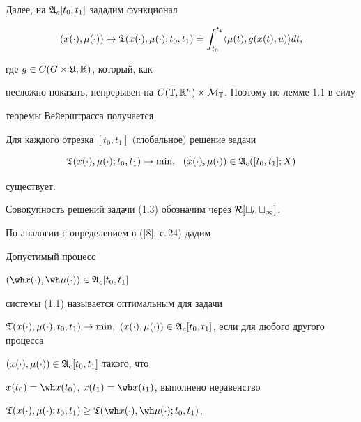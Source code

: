 Далее, на $\frak A_c[t_0,t_1]$ зададим функционал


\begin{equation}


(x(\cdot),\mu(\cdot))\mapsto


\frak T(x(\cdot),\mu(\cdot);t_0,t_1)


\doteq\int_{t_0}^{t_1}\langle\mu(t),g(x(t),u)\rangle dt,


\end{equation}


где $g\in C(G\times\frak U,\Bbb R)$, который, как


несложно показать, непрерывен на $C(\Bbb T,\Bbb R^n)


\times\cal M_{\Bbb T}$. Поэтому по лемме 1.1 в силу


теоремы Вейерштрасса получается








\begin{lems}


Для каждого отрезка $[t_0,t_1]$ $($глобальное\/$)$ решение задачи


\begin{equation}


\frak T(x(\cdot),\mu(\cdot);t_0,t_1)\to\min,\ \ (x(\cdot),\mu(\cdot))


\in\frak A_c([t_0,t_1];X)


\end{equation}


существует.


\end{lems}





Совокупность решений задачи (1.3) обозначим через $\cal R[t_0,t_1]$.





По аналогии с определением в ([8], с.\,24) дадим





\begin{defns}


Допустимый процесс


$(\wh x(\cdot),\wh \mu(\cdot))\in\frak A_c[t_0,t_1]$


системы (1.1) называется оптимальным для задачи


$\frak T(x(\cdot),\mu(\cdot);t_0,t_1)\to\min,\ (x(\cdot),\mu(\cdot))


\in\frak A_c[t_0,t_1]$, если для любого другого процесса


$(x(\cdot),\mu(\cdot))\in\frak A_c[t_0,t_1]$ такого, что


$x(t_0)=\wh x(t_0)$, $x(t_1)=\wh x(t_1)$, выполнено неравенство


$\frak T(x(\cdot),\mu(\cdot);t_0,t_1)


\ge\frak T(\wh x(\cdot),\wh\mu(\cdot);t_0,t_1)$.


\end{defns}






